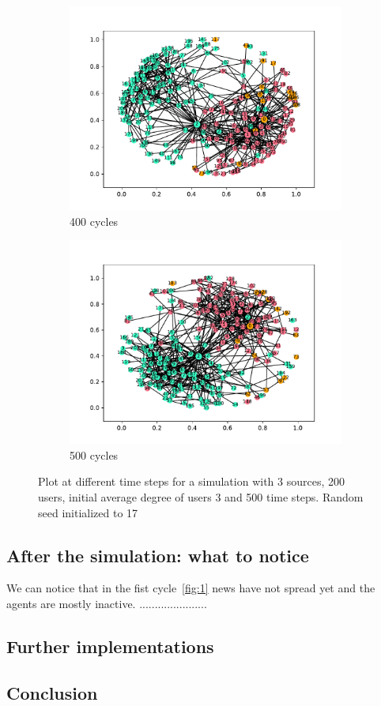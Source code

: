 \begin{figure}
  \begin{subfigure}[t]{.45\textwidth}
    \centering
    \includegraphics[trim={1cm .5cm 1cm 1cm}, clip, width=\linewidth]{img/pdf/plot-0400.pdf} 
    \caption{400 cycles}
    \label{fig:400}
  \end{subfigure}
  \begin{subfigure}[t]{.45\textwidth}
    \centering
    \includegraphics[trim={1cm .5cm 1cm 1cm}, clip, width=\linewidth]{img/pdf/plot-0500.pdf} 
    \caption{500 cycles}
    \label{fig:500}
  \end{subfigure}
 
  \caption{Plot at different time steps for a simulation with 3 sources, 200 users, initial average degree of users 3 and 500 time steps. Random seed initialized to 17}
\end{figure}

\subsection{After the simulation: what to notice}
We can notice that in the fist cycle~\ref{fig:1} news have not spread yet and the agents are mostly inactive. ......................

\subsection{Further implementations}

\subsection{Conclusion}

